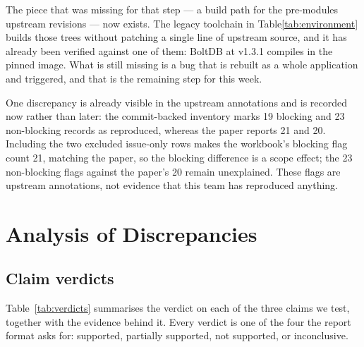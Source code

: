 \documentclass[11pt]{article}
\begin{document}
The piece that was missing for that step --- a build path for the pre-modules
upstream revisions --- now exists. The legacy toolchain in
Table\ref{tab:environment} builds those trees without patching a single line
of upstream source, and it has already been verified against one of them:
BoltDB at v1.3.1 compiles in the pinned image. What is still missing is a bug
that is rebuilt as a whole application and triggered, and that is the remaining
step for this week.

One discrepancy is already visible in the upstream annotations and is
recorded now rather than later: the commit-backed inventory marks 19
blocking and 23 non-blocking records as reproduced, whereas the paper reports
21 and 20. Including the two excluded issue-only rows makes the workbook's
blocking flag count 21, matching the paper, so the blocking difference is a
scope effect; the 23 non-blocking flags against the paper's 20 remain
unexplained. These flags are upstream annotations, not evidence that this team
has reproduced anything.

\section{Analysis of Discrepancies}
\label{sec:discrepancies}

\subsection{Claim verdicts}

Table~\ref{tab:verdicts} summarises the verdict on each of the three claims we test, together with the evidence behind it. Every verdict is one of the four the report format asks for: supported, partially supported, not supported, or inconclusive.
\end{document}
